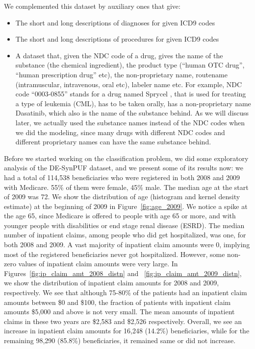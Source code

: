 We complemented this dataset by auxiliary ones that give: 
\begin{itemize}
\item The short and long descriptions of diagnoses for given ICD9 codes
\item The short and long descriptions of procedures for given ICD9 codes
\item A dataset that, given the NDC code of a drug, gives the name of the substance (the chemical ingredient), the product type (``human OTC drug'', ``human prescription drug'' etc), the non-proprietary name, routename (intramuscular, intravenous, oral etc), labeler name etc. For example, NDC code ``0003-0855'' stands for a drug named Sprycel \cite{sprycel}, that is used for treating a type of leukemia (CML), has to be taken orally, has a non-proprietary name Dasatinib, which also is the name of the substance behind. As we will discuss later, we actually used the substance names instead of the NDC codes when we did the modeling, since many drugs with different NDC codes and different proprietary names can have the same substance behind.  
\end{itemize}
 
Before we started working on the classification problem, we did some exploratory analysis of the DE-SynPUF dataset, and we present some of its results now: we had a total of 114,538 beneficiaries who were registered in both 2008 and 2009 with Medicare. 55\% of them were female, 45\% male. The median age at the start of 2009 was 72. We show the distribution of age (histogram and kernel density estimate) at the beginning of 2009 in Figure~\ref{fig:age_2009}. We notice a spike at the age 65, since Medicare is offered to people with age 65 or more, and with younger people with disabilities or end stage renal disease (ESRD). The median number of inpatient claims, among people who did get hospitalized, was one, for both 2008 and 2009. A vast majority of inpatient claim amounts were 0, implying most of the registered beneficiaries never got hospitalized. However, some non-zero values of inpatient claim amounts were very large. In Figures~\ref{fig:ip_claim_amt_2008_distn} and ~\ref{fig:ip_claim_amt_2009_distn}, we show the distribution of inpatient claim amounts for 2008 and 2009, respectively. We see that although 75-80\% of the patients had an inpatient claim amounts between \$0 and \$100, the fraction of patients with inpatient claim amounts \$5,000 and above is not very small. The mean amounts of inpatient claims in these two years are \$2,583 and \$2,526 respectively. Overall, we see an increase in inpatient claim amounts for 16,248 (14.2\%) beneficiaries, while for the remaining 98,290 (85.8\%) beneficiaries, it remained same or did not increase.


